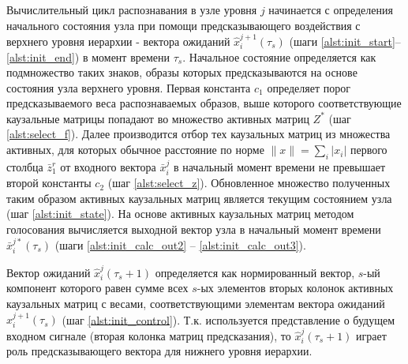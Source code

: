 \documentclass[12pt]{scrartcl}
\begin{document}
	Вычислительный цикл распознавания в узле уровня $j$ начинается с определения начального состояния узла при помощи предсказывающего воздействия с верхнего уровня иерархии - вектора ожиданий $\hat x_i^{j+1}(\tau_s)$ (шаги \ref{alst:init_start}--\ref{alst:init_end}) в момент времени $\tau_s$. Начальное состояние определяется как подмножество таких знаков, образы которых предсказываются на основе состояния узла верхнего уровня. Первая константа $c_1$ определяет порог предсказываемого веса распознаваемых образов, выше которого соответствующие каузальные матрицы попадают во множество активных матриц $Z^*$ (шаг \ref{alst:select_f}). Далее производится отбор тех каузальных матриц из множества активных, для которых обычное расстояние по норме $\|x\|=\sum_i |x_i|$ первого столбца $\bar z_1^r$ от входного вектора $\bar x_i^j$ в начальный момент времени не превышает второй константы $c_2$ (шаг \ref{alst:select_z}). Обновленное множество полученных таким образом активных каузальных матриц является текущим состоянием узла (шаг \ref{alst:init_state}). На основе активных каузальных матриц методом голосования вычисляется выходной вектор узла  в начальный момент времени $\bar x_i^{j*}(\tau_s)$ (шаги \ref{alst:init_calc_out2} -- \ref{alst:init_calc_out3}).

	\linespread{1}
	\begin{algorithm}[H]
		\label{alg:automato}
		\begin{algorithmic}[1]
			
		\end{algorithmic}
	\end{algorithm}
	\linespread{2}

	Вектор ожиданий $\hat x_i^j(\tau_s+1)$ определяется как нормированный вектор, $s$-ый компонент которого равен сумме всех $s$-ых элементов вторых колонок активных каузальных матриц с весами, соответствующими элементам вектора ожиданий $\hat x_i^{j+1}(\tau_s)$ (шаг \ref{alst:init_control}). Т.к. используется представление о будущем входном сигнале (вторая колонка матриц предсказания), то $\hat x_i^j(\tau_s+1)$ играет роль предсказывающего вектора для нижнего уровня иерархии.

	\linespread{1}
	\begin{algorithm}[H]
		\begin{algorithmic}[1]
			\algrestore{algst:store1}
			
		\end{algorithmic}
	\end{algorithm}
	\linespread{2}
		
\end{document}
